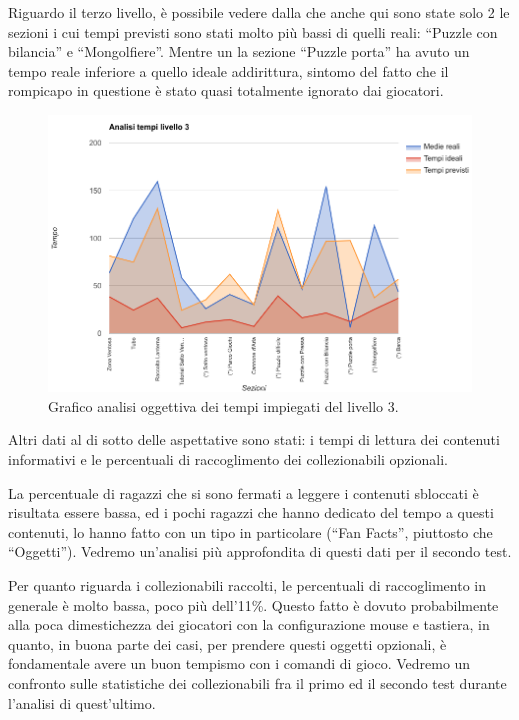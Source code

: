 Riguardo il terzo livello, è possibile vedere dalla  \myfig{\ref{fig:test_analisi_tempi_03}} che anche qui sono state solo 2 le sezioni i cui tempi previsti sono stati molto più bassi di quelli reali: ``Puzzle con bilancia'' e ``Mongolfiere''. Mentre un la sezione ``Puzzle porta'' ha avuto un tempo reale inferiore a quello ideale addirittura, sintomo del fatto che il rompicapo in questione è stato quasi totalmente ignorato dai giocatori.

\begin{figure}[h]
\centerline{\includegraphics[scale=0.45]{images/risultati/test_01_analisi_tempi_03.png}}
\caption{Grafico analisi oggettiva dei tempi impiegati del livello 3.}
\label{fig:test_analisi_tempi_03}
\end{figure}

Altri dati al di sotto delle aspettative sono stati: i tempi di lettura dei contenuti informativi e le percentuali di raccoglimento dei collezionabili opzionali. 

La percentuale di ragazzi che si sono fermati a leggere i contenuti sbloccati è risultata essere bassa, ed i pochi ragazzi che hanno dedicato del tempo a questi contenuti, lo hanno fatto con un tipo in particolare (``Fan Facts'', piuttosto che ``Oggetti''). Vedremo un'analisi più approfondita di questi dati per il secondo test.

Per quanto riguarda i collezionabili raccolti, le percentuali di raccoglimento in generale è molto bassa, poco più dell'11\%. Questo fatto è dovuto probabilmente alla poca dimestichezza dei giocatori con la configurazione mouse e tastiera, in quanto, in buona parte dei casi, per prendere questi oggetti opzionali, è fondamentale avere un buon tempismo con i comandi di gioco. Vedremo un confronto sulle statistiche dei collezionabili fra il primo ed il secondo test durante l'analisi di quest'ultimo.


